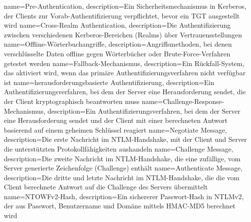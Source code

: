 {
	name={Pre-Au\-then\-ti\-ca\-ti\-on},
	description={Ein Si\-cher\-heits\-me\-cha\-nis\-mus in Ker\-be\-ros, der Cli\-ents zur Vor\-ab-Au\-then\-ti\-fi\-zie\-rung ver\-pflich\-tet, be\-vor ein TGT aus\-ge\-stellt wird}
}
{
	name={Cross-Realm Au\-then\-ti\-ca\-ti\-on},
	description={Die Au\-then\-ti\-fi\-zie\-rung zwi\-schen ver\-schie\-de\-nen Ker\-be\-ros-Be\-rei\-chen (Realms) über Ver\-trau\-ens\-stel\-lun\-gen}
}
{
	name={Off\-line-Wör\-ter\-buch\-an\-grif\-fe},
	description={An\-griffs\-me\-tho\-den, bei de\-nen ver\-schlüs\-sel\-te Da\-ten off\-line ge\-gen Wör\-ter\-bü\-cher oder Brute-Force-Ver\-fah\-ren ge\-tes\-tet wer\-den}
}
{
	name={Fall\-back-Me\-cha\-nis\-mus},
	description={Ein Rück\-fall-Sys\-tem, das ak\-ti\-viert wird, wenn das pri\-mä\-re Au\-then\-ti\-fi\-zie\-rungs\-ver\-fah\-ren nicht ver\-füg\-bar ist}
}
{
	name={her\-aus\-for\-de\-rungs\-ba\-sier\-te Au\-then\-ti\-fi\-zie\-rung},
	description={Ein Au\-then\-ti\-fi\-zie\-rungs\-ver\-fah\-ren, bei dem der Ser\-ver eine Her\-aus\-for\-de\-rung sen\-det, die der Cli\-ent kryp\-to\-gra\-phisch be\-ant\-wor\-ten muss}
}
{
	name={Chal\-lenge-Re\-spon\-se-Me\-cha\-nis\-mus},
	description={Ein Au\-then\-ti\-fi\-zie\-rungs\-ver\-fah\-ren, bei dem der Ser\-ver eine Her\-aus\-for\-de\-rung sen\-det und der Cli\-ent mit ei\-ner be\-rech\-ne\-ten Ant\-wort ba\-sie\-rend auf ei\-nem ge\-hei\-men Schlüs\-sel re\-agiert}
}
{
	name={Ne\-go\-tia\-te Mes\-sa\-ge},
	description={Die ers\-te Nach\-richt im NTLM-Hand\-shake, mit der Cli\-ent und Ser\-ver die un\-ter\-stütz\-ten Pro\-to\-koll\-fä\-hig\-kei\-ten aus\-han\-deln}
}
{
	name={Chal\-lenge Mes\-sa\-ge},
	description={Die zwei\-te Nach\-richt im NTLM-Hand\-shake, die eine zu\-fäl\-li\-ge, vom Ser\-ver ge\-ne\-rier\-te Zei\-chen\-fol\-ge (Chal\-lenge) ent\-hält}
}
{
	name={Au\-then\-ti\-ca\-te Mes\-sa\-ge},
	description={Die drit\-te und letz\-te Nach\-richt im NTLM-Hand\-shake, die die vom Cli\-ent be\-rech\-ne\-te Ant\-wort auf die Chal\-lenge des Ser\-vers über\-mit\-telt}
}
{
	name={NTOWFv2-Hash},
	description={Ein si\-che\-re\-rer Pass\-wort-Hash in NTLMv2, der aus Pass\-wort, Be\-nut\-zer\-na\-me und Do\-mä\-ne mit\-tels HMAC-MD5 be\-rech\-net wird}
}
